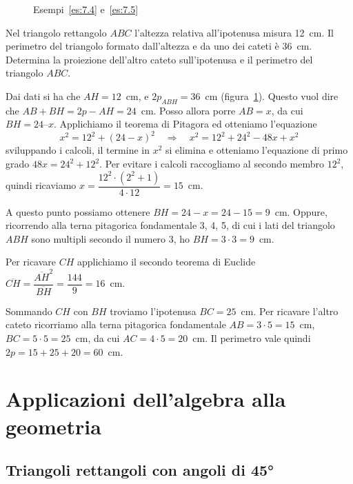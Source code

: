 \begin{inaccessibleblock}
 \begin{figure}[!htb]
  \centering
  \caption{Esempi~\ref{es:7.4} e~\ref{es:7.5}}\label{fig:es7.4}
\end{figure}
\end{inaccessibleblock}

\begin{esempio}\label{es:7.5}
Nel triangolo rettangolo $ABC$ l'altezza relativa all'ipotenusa 
misura 12~cm. Il perimetro del triangolo formato dall'altezza e da uno 
dei cateti è 36~cm. Determina la proiezione dell'altro cateto 
sull'ipotenusa e il perimetro del triangolo $ABC$.\vspace{7pt}

Dai dati si ha che $AH = 12$~cm, e $2p_{ABH} = 36$~cm 
(figura~\ref{fig:es7.4}).
Questo vuol dire che $AB + BH = 2p - AH = 24$~cm. 
Posso allora porre $AB = x$, da cui $BH = 24 – x$.
Applichiamo il teorema di Pitagora ed otteniamo l'equazione
\[x^2 = 12^2 + (24 - x)^2 \quad\Rightarrow\quad x^2 = 12^2 + 24^2 - 
48x + x^2\]
sviluppando i calcoli, il termine in $x^2$ si elimina e otteniamo 
l'equazione di primo grado $48x = 24^2 + 12^2$.
Per evitare i calcoli raccogliamo al secondo membro $12^2$, quindi 
ricaviamo $x=\dfrac{12^2\cdot\left(2^2+1\right)}{4\cdot 12}=15$~cm.

A questo punto possiamo ottenere $BH = 24-x = 24-15 = 9$~cm. Oppure, 
ricorrendo alla terna pitagorica fondamentale 3, 4, 5, di cui i lati 
del triangolo $ABH$ sono multipli secondo il numero 3, ho $BH = 3 
\cdot 3 = 9$~cm.

Per ricavare $CH$ applichiamo il secondo teorema di Euclide 
$\overline{CH}=\dfrac{\overline{AH}^2}{\overline{BH}}=\dfrac{144}{9}
=16$~cm.

Sommando $CH$ con $BH$ troviamo l'ipotenusa $BC=25$~cm. Per ricavare 
l'altro cateto ricorriamo alla terna pitagorica fondamentale 
$AB=3\cdot 5=15$~cm, $BC=5\cdot 5=25$~cm, da cui $AC=4\cdot 5=20$~cm.
Il perimetro vale quindi $2p=15+25+20=60$~cm.
\end{esempio}

\section{Applicazioni dell'algebra alla geometria}
\label{sect:applicazioni_algebra}

\subsection{Triangoli rettangoli con angoli di 45°}


